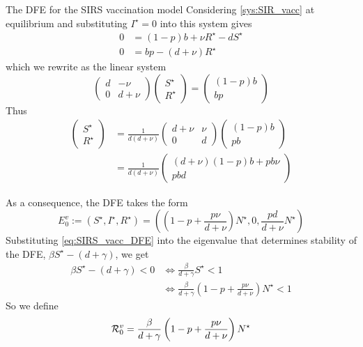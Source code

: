 \documentclass[aspectratio=43]{beamer}
\begin{document}
\begin{frame}{The DFE for the SIRS vaccination model}
Considering \eqref{sys:SIR_vacc} at equilibrium and substituting $I^\star=0$ into this system gives
\begin{align*}
0 &= (1-p)b+\nu R^\star-dS^\star \\
0 &= bp-(d+\nu)R^\star
\end{align*}
which we rewrite as the linear system
\[
\begin{pmatrix}
d & -\nu \\ 0 & d+\nu
\end{pmatrix}
\begin{pmatrix}
S^\star \\ R^\star
\end{pmatrix}
=
\begin{pmatrix}
(1-p)b \\ bp
\end{pmatrix}
\]
Thus
\begin{align*}
\begin{pmatrix}
S^\star \\ R^\star
\end{pmatrix}
&= \frac{1}{d(d+\nu)}
\begin{pmatrix}
d+\nu & \nu \\ 0 & d
\end{pmatrix}
\begin{pmatrix}
(1-p)b \\ pb
\end{pmatrix} \\
&= \frac{1}{d(d+\nu)}
\begin{pmatrix}
(d+\nu)(1-p)b+pb\nu \\ pbd
\end{pmatrix}
\end{align*}
\end{frame}

\begin{frame}
As a consequence, the DFE takes the form
\begin{equation}\label{eq:SIRS_vacc_DFE}
E_0^v := (S^\star,I^\star,R^\star) =
\left(
\left(1-p+\frac{p\nu}{d+\nu}\right)N^\star,0,
\frac{pd}{d+\nu}N^\star
\right)
\end{equation}
\vfill
Substituting \eqref{eq:SIRS_vacc_DFE} into the eigenvalue that determines stability of the DFE, $\beta S^\star-(d+\gamma)$, we get
\begin{align*}
\beta S^\star-(d+\gamma)<0 &\iff
\frac\beta{d+\gamma} S^\star <1 \\
&\iff 
\frac\beta{d+\gamma}
\left(1-p+\frac{p\nu}{d+\nu}\right)N^\star<1
\end{align*}
So we define
\begin{equation}\label{eq:SIRS_vacc_R0}
\mathcal{R}_0^v =
\frac\beta{d+\gamma}
\left(1-p+\frac{p\nu}{d+\nu}\right)N^\star
\end{equation}
\end{frame}
\end{document}
